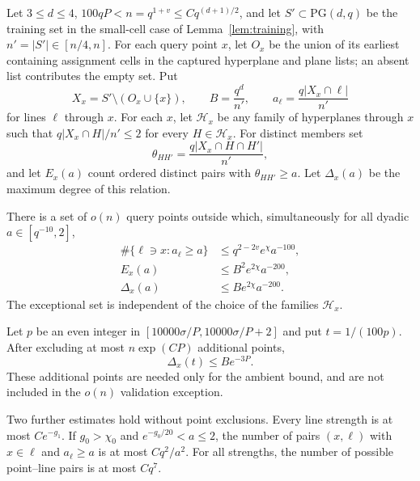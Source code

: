 \begin{lemma}\label{lem:overlap-geometry}
Let $3\le d\le4$, $100qP<n=q^{1+v}\le Cq^{(d+1)/2}$, and let
$S'\subset\mathrm{PG}(d,q)$ be the training set in the small-cell case of
Lemma~\ref{lem:training}, with $n'=|S'|\in[n/4,n]$.
For each query point $x$, let $O_x$ be the union of its earliest containing
assignment cells in the captured hyperplane and plane lists; an absent
list contributes the empty set.  Put
\[
 X_x=S'\setminus(O_x\cup\{x\}),\qquad B=\frac{q^d}{n'},\qquad
 a_\ell=\frac{q|X_x\cap\ell|}{n'}
\]
for lines $\ell$ through $x$.
For each $x$, let $\mathcal H_x$ be any family of hyperplanes through $x$
such that $q|X_x\cap H|/n'\le2$ for every $H\in\mathcal H_x$.
For distinct members set
\[
 \theta_{HH'}=\frac{q|X_x\cap H\cap H'|}{n'},
\]
and let $E_x(a)$ count ordered distinct pairs with $\theta_{HH'}\ge a$.
Let $\Delta_x(a)$ be the maximum degree of this relation.

There is a set of $o(n)$ query points outside which, simultaneously for
all dyadic $a\in[q^{-10},2]$,
\begin{align}
 \#\{\ell\ni x:a_\ell\ge a\}
   &\le q^{2-2v}e^\chi a^{-100},\label{eq:local-rich-lines}\\
 E_x(a)&\le B^2e^{2\chi}a^{-200},\label{eq:overlap-pairs}\\
 \Delta_x(a)&\le Be^{2\chi}a^{-200}.\label{eq:overlap-degree}
\end{align}
The exceptional set is independent of the choice of the families
$\mathcal H_x$.

Let $p$ be an even integer in
$[10000\sigma/P,10000\sigma/P+2]$ and put $t=1/(100p)$.
After excluding at most $n\exp(CP)$ additional points,
\begin{equation}\label{eq:ambient-overlap-degree}
 \Delta_x(t)\le B e^{-3P}.
\end{equation}
These additional points are needed only for the ambient bound, and are
not included in the $o(n)$ validation exception.

Two further estimates hold without point exclusions.  Every line strength
is at most $Ce^{-g_1}$.  If $g_0>\chi_0$ and
$e^{-g_0/20}<a\le2$, the number of pairs $(x,\ell)$ with $x\in\ell$ and
$a_\ell\ge a$ is at most $Cq^2/a^2$.  For all strengths, the number of
possible point--line pairs is at most $Cq^7$.
\end{lemma}

